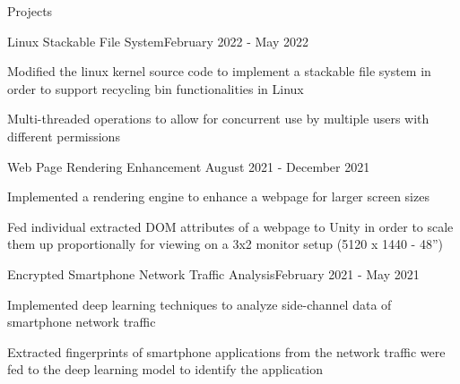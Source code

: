 \documentclass{resume} %
\begin{document}
\begin{rSection}{Projects}

\begin{rSubsection}{Linux Stackable File System}{February 2022 - May 2022}{}{}
\item Modified the linux kernel source code to implement a stackable file system in order to support recycling bin functionalities in Linux  
\item Multi-threaded operations to allow for concurrent use by multiple users with different permissions
\end{rSubsection}
\begin{rSubsection}{Web Page Rendering Enhancement }{August 2021 - December 2021}{}{}
\item Implemented a rendering engine to enhance a webpage for larger screen sizes
\item Fed individual extracted DOM attributes of a webpage to Unity in order to scale them up proportionally for viewing on a 3x2 monitor setup (5120 x 1440 - 48”)
\end{rSubsection}
\begin{rSubsection}{Encrypted Smartphone Network Traffic Analysis}{February 2021 - May 2021}{}{}
\item Implemented deep learning techniques to analyze side-channel data of smartphone network traffic
\item Extracted fingerprints of smartphone applications from the network traffic were fed to the deep learning model to identify the application
\end{rSubsection}
\end{rSection}
\newpage
\end{document}
